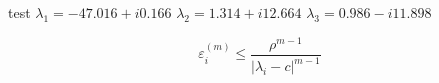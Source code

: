
 test
$\lambda_{1} = -47.016 + i 0.166$  $ \lambda_{2} = 1.314 + i 12.664$ $\lambda_{3} = 0.986 - i11.898$

\begin{equation*}
  \varepsilon_{i}^{(m)}\leq \frac{\rho^{m-1}}{|\lambda_{i} - c|^{m-1}}
\end{equation*}
